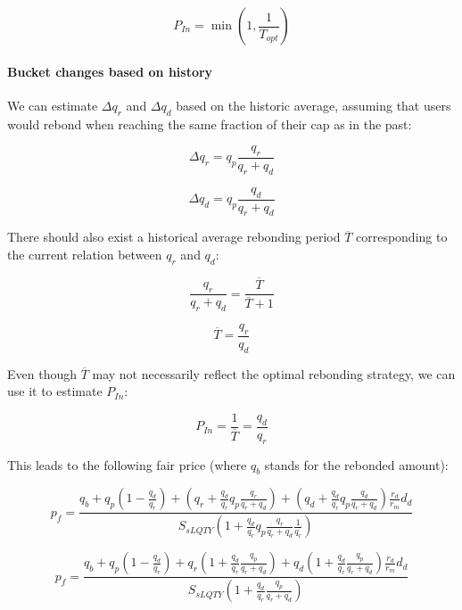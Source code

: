 \documentclass{article}
\begin{document}
\begin{equation}
    P_{In} = \min \left(1,\frac{1}{T_{opt}}\right)
\end{equation} 

\paragraph{Bucket changes based on history}
We can estimate $\Delta q_{r}$ and $\Delta q_{d}$ based on the historic average, assuming that users would rebond when reaching the same fraction of their cap as in the past:

\begin{equation}
\Delta q_{r} = q_{p} \frac{q_{r}}{q_{r}+q_{d}}
\end{equation}

\begin{equation}
\Delta q_{d} = q_{p} \frac{q_{d}}{q_{r}+q_{d}}
\end{equation}

There should also exist a historical average rebonding period $\overline{T}$ corresponding to the current relation between $q_r$ and $q_d$:

\begin{equation}
    \frac{q_{r}}{q_{r}+q_{d}} = \frac{\overline{T}}{\overline{T}+1}
\end{equation}

\begin{equation}
    \overline{T} = \frac{q_{r}}{q_{d}}
\end{equation}

Even though $\overline{T}$ may not necessarily reflect the optimal rebonding strategy, we can use it to estimate $P_{In}$:

\begin{equation}
   P_{In} = \frac{1}{\overline{T}} = \frac{q_{d}}{q_{r}}
\end{equation}

This leads to the following fair price (where $q_b$ stands for the rebonded amount):

\[
p_{f} = \frac{q_{b}+q_{p} \left(1-\frac{q_{d}}{q_{r}}\right)+\left(q_{r}+\frac{q_{d}}{q_{r}}q_{p}\frac{q_{r}}{q_{r}+q_{d}}\right)+ \left(q_{d}+\frac{q_{d}}{q_{r}}q_{p}\frac{q_{d}}{q_{r}+q_{d}}\right)\frac{r_{d}}{r_{m}}d_{d}}{S_{sLQTY} \left( 1+\frac{q_{d}}{q_{r}} q_{p}\frac{q_{r}}{q_{r}+q_{d}}\frac{1}{q_{r}} \right)}
\]

\[
p_{f} = \frac{q_{b}+q_{p} \left(1-\frac{q_{d}}{q_{r}}\right)+q_{r}\left(1+\frac{q_{d}}{q_{r}}\frac{q_{p}}{q_{r}+q_{d}}\right)+q_{d} \left(1+\frac{q_{d}}{q_{r}}\frac{q_{p}}{q_{r}+q_{d}}\right)\frac{r_{d}}{r_{m}}d_{d}}{S_{sLQTY} \left( 1+\frac{q_{d}}{q_{r}}\frac{q_{p}}{q_{r}+q_{d}} \right)}
\]
\end{document}
